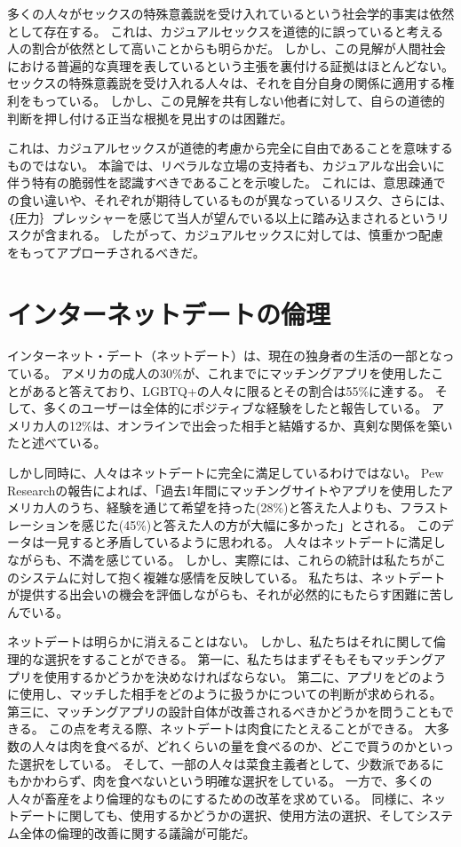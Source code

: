 \documentclass[paper=a4,book,openany]{jlreq}
\newcommand{\ig}[1]{}           %
\begin{document}
多くの人々がセックスの特殊意義説を受け入れているという社会学的事実は依然として存在する。
これは、カジュアルセックスを道徳的に誤っていると考える人の割合が依然として高いことからも明らかだ。
しかし、この見解が人間社会における普遍的な真理を表しているという主張を裏付ける証拠はほとんどない。
セックスの特殊意義説を受け入れる人々は、それを自分自身の関係に適用する権利をもっている。
しかし、この見解を共有しない他者に対して、自らの道徳的判断を押し付ける正当な根拠を見出すのは困難だ。

これは、カジュアルセックスが道徳的考慮から完全に自由であることを意味するものではない。
本論では、リベラルな立場の支持者も、カジュアルな出会いに伴う特有の脆弱性を認識すべきであることを示唆した。
これには、意思疎通での食い違いや、それぞれが期待しているものが異なっているリスク、さらには、｛圧力｝{プレッシャー}を感じて当人が望んでいる以上に踏み込まされるというリスクが含まれる。
したがって、カジュアルセックスに対しては、慎重かつ配慮をもってアプローチされるべきだ。

\section{インターネットデートの倫理}

インターネット・デート（ネットデート）は、現在の独身者の生活の一部となっている。
アメリカの成人の30\%が、これまでにマッチングアプリを使用したことがあると答えており、LGBTQ+の人々に限るとその割合は55\%に達する。
そして、多くのユーザーは全体的にポジティブな経験をしたと報告している。
アメリカ人の12\%は、オンラインで出会った相手と結婚するか、真剣な関係を築いたと述べている\citep{anderson20:_virt_down_onlin_datin}。
\ig{Monica Anderson}

しかし同時に、人々はネットデートに完全に満足しているわけではない。
Pew Researchの報告によれば、「過去1年間にマッチングサイトやアプリを使用したアメリカ人のうち、経験を通じて希望を持った(28\%)と答えた人よりも、フラストレーションを感じた(45\%)と答えた人の方が大幅に多かった」とされる\citep{anderson20:_virt_down_onlin_datin}。
このデータは一見すると矛盾しているように思われる。
人々はネットデートに満足しながらも、不満を感じている。
しかし、実際には、これらの統計は私たちがこのシステムに対して抱く複雑な感情を反映している。
私たちは、ネットデートが提供する出会いの機会を評価しながらも、それが必然的にもたらす困難に苦しんでいる。

ネットデートは明らかに消えることはない。
しかし、私たちはそれに関して倫理的な選択をすることができる。
第一に、私たちはまずそもそもマッチングアプリを使用するかどうかを決めなければならない。
第二に、アプリをどのように使用し、マッチした相手をどのように扱うかについての判断が求められる。
第三に、マッチングアプリの設計自体が改善されるべきかどうかを問うこともできる。
この点を考える際、ネットデートは肉食にたとえることができる。
大多数の人々は肉を食べるが、どれくらいの量を食べるのか、どこで買うのかといった選択をしている。
そして、一部の人々は菜食主義者として、少数派であるにもかかわらず、肉を食べないという明確な選択をしている。
一方で、多くの人々が畜産をより倫理的なものにするための改革を求めている。
同様に、ネットデートに関しても、使用するかどうかの選択、使用方法の選択、そしてシステム全体の倫理的改善に関する議論が可能だ。
\end{document}
